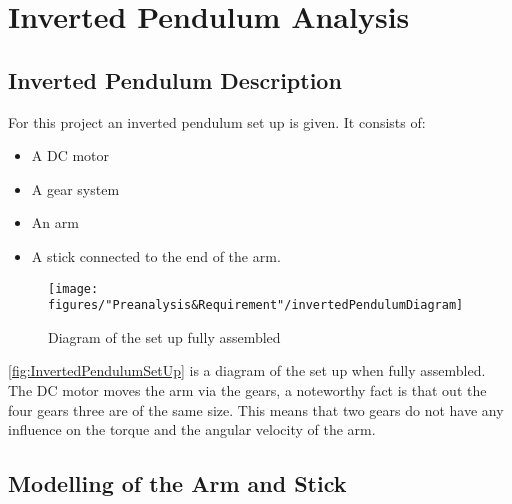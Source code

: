 \chapter{Inverted Pendulum Analysis}


\section{Inverted Pendulum Description}\label{sec:IPDesc}
For this project an inverted pendulum set up is given. It consists of:
\begin{itemize}
	\item A DC motor
	\item A gear system
	\item An arm
	\item A stick connected to the end of the arm.
\end{itemize}

\begin{figure} [htbp]
	\centering
	\texttt{[image: figures/"Preanalysis\&Requirement"/invertedPendulumDiagram]}
	\caption{Diagram of the set up fully assembled} \label{fig:InvertedPendulumSetUp}
\end{figure}

\autoref{fig:InvertedPendulumSetUp} is a diagram of the set up when fully assembled. The DC motor moves the arm via the gears, a noteworthy fact is that out the four gears three are of the same size. This means that two gears do not have any influence on the torque and the angular velocity of the arm.




\section{Modelling of the Arm and Stick}\label{sec:StickArm}

